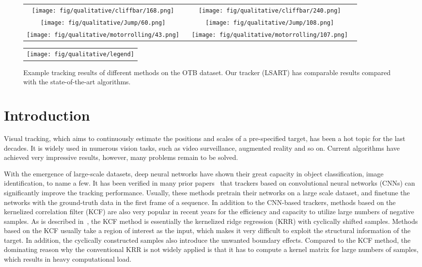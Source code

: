 \documentclass[10pt,twocolumn,letterpaper]{article}
\begin{document}
\begin{figure}[t]
\centering
\begin{tabular}{c@{}c}


\texttt{[image: fig/qualitative/cliffbar/168.png]}
\ &
\texttt{[image: fig/qualitative/cliffbar/240.png]}
\ \\
\texttt{[image: fig/qualitative/Jump/60.png]}
\ &
\texttt{[image: fig/qualitative/Jump/108.png]}
\ \\
\texttt{[image: fig/qualitative/motorrolling/43.png]}
\ &
\texttt{[image: fig/qualitative/motorrolling/107.png]}
\ \\
\end{tabular}
\begin{tabular}{c}
{\kern 6mm}\texttt{[image: fig/qualitative/legend]}
\end{tabular}
\caption{Example tracking results of different methods on the OTB dataset. Our tracker (LSART) has comparable results compared with the state-of-the-art algorithms.}
\label{fig:tracking_results}
\vspace{-2mm}
\end{figure}


\section{Introduction}
Visual tracking, which aims to continuously estimate the positions and scales of a
pre-specified target, has been a hot topic for the last decades. It is widely
used in numerous vision tasks, such as video surveillance, augmented reality and so on.
Current algorithms have achieved very impressive results, however, many problems
remain to be solved.

With the emergence of large-scale datasets, deep neural networks have shown their
great capacity in object classification, image identification, to name a few.
It has been verified in many prior papers~\cite{wang2015visual,nam2016learning,LiWWL18}
that trackers based on convolutional neural networks (CNNs) can significantly
improve the tracking performance. Usually, these methods pretrain their networks
on a large scale dataset, and finetune the networks with the ground-truth data
in the first frame of a sequence.
In addition to the CNN-based trackers, methods based on the kernelized correlation
filter (KCF) are also very popular in recent years for the efficiency and capacity
to utilize large numbers of negative samples. As is described in~\cite{henriques2015high},
the KCF method is essentially the kernelized ridge regression (KRR) with cyclically
shifted samples. Methods based on the KCF usually take a region of interest as the
input, which makes it very difficult to exploit the structural information of the
target. In addition, the cyclically constructed samples also introduce the unwanted
boundary effects. Compared to the KCF method, the dominating reason why the conventional
KRR is not widely applied is that it has to compute a kernel matrix for large numbers of
samples, which results in heavy computational load.
\end{document}
